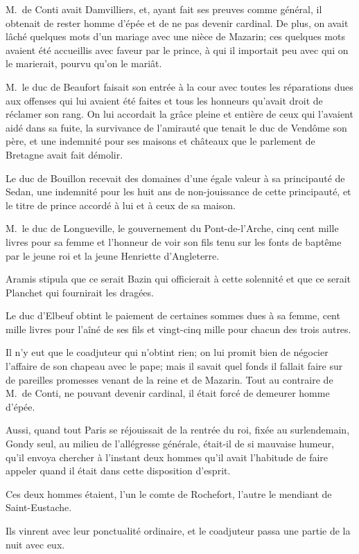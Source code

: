 M.~de Conti avait Damvilliers, et, ayant fait ses preuves comme général, il obtenait de rester homme d'épée et de ne pas devenir cardinal. De plus, on avait lâché quelques mots d'un mariage avec une nièce de Mazarin; ces quelques mots avaient été accueillis avec faveur par le prince, à qui il importait peu avec qui on le marierait, pourvu qu'on le mariât.

M.~le duc de Beaufort faisait son entrée à la cour avec toutes les réparations dues aux offenses qui lui avaient été faites et tous les honneurs qu'avait droit de réclamer son rang. On lui accordait la grâce pleine et entière de ceux qui l'avaient aidé dans sa fuite, la survivance de l'amirauté que tenait le duc de Vendôme son père, et une indemnité pour ses maisons et châteaux que le parlement de Bretagne avait fait démolir.

Le duc de Bouillon recevait des domaines d'une égale valeur à sa principauté de Sedan, une indemnité pour les huit ans de non-jouissance de cette principauté, et le titre de prince accordé à lui et à ceux de sa maison.

M.~le duc de Longueville, le gouvernement du Pont-de-l'Arche, cinq cent mille livres pour sa femme et l'honneur de voir son fils tenu sur les fonts de baptême par le jeune roi et la jeune Henriette d'Angleterre.

Aramis stipula que ce serait Bazin qui officierait à cette solennité et que ce serait Planchet qui fournirait les dragées.

Le duc d'Elbeuf obtint le paiement de certaines sommes dues à sa femme, cent mille livres pour l'aîné de ses fils et vingt-cinq mille pour chacun des trois autres.

Il n'y eut que le coadjuteur qui n'obtint rien; on lui promit bien de négocier l'affaire de son chapeau avec le pape; mais il savait quel fonds il fallait faire sur de pareilles promesses venant de la reine et de Mazarin. Tout au contraire de M.~de Conti, ne pouvant devenir cardinal, il était forcé de demeurer homme d'épée.

Aussi, quand tout Paris se réjouissait de la rentrée du roi, fixée au surlendemain, Gondy seul, au milieu de l'allégresse générale, était-il de si mauvaise humeur, qu'il envoya chercher à l'instant deux hommes qu'il avait l'habitude de faire appeler quand il était dans cette disposition d'esprit.

Ces deux hommes étaient, l'un le comte de Rochefort, l'autre le mendiant de Saint-Eustache.

Ils vinrent avec leur ponctualité ordinaire, et le coadjuteur passa une partie de la nuit avec eux.